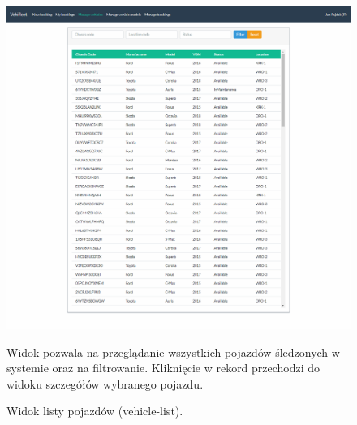 \documentclass[eng,printmode,openany]{mgr}
\begin{document}
	\begin{figure}[H]
		\centering
		\includegraphics[width=\textwidth]{images/views/vehicle-list.png}
		\caption{Widok listy pojazdów (vehicle-list).}
		\small 
		Widok pozwala na przeglądanie wszystkich pojazdów śledzonych w systemie oraz na filtrowanie. Kliknięcie w rekord przechodzi do widoku szczegółów wybranego pojazdu.
	\end{figure}
	
\end{document}
